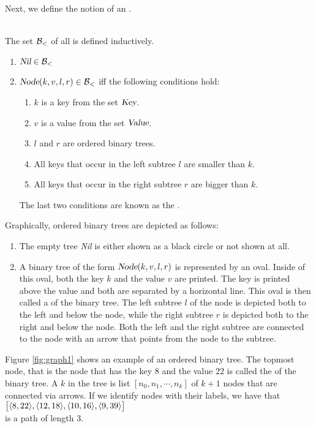 \noindent
Next, we define the notion of an  .
\begin{Definition} \hspace*{\fill} \\
  The set $\mathcal{B}_<$ of all  is defined inductively.
  \begin{enumerate}
  \item $\textsl{Nil} \in \mathcal{B}_<$
  \item $\textsl{Node}(k, v, l, r) \in \mathcal{B}_<$ \quad iff the following conditions hold:
        \begin{enumerate}
        \item $k$ is a key from the set $\textsl{Key}$.
        \item $v$ is a value from the set $\textsl{Value}$.
        \item $l$ and $r$ are ordered binary trees.
        \item All keys that occur in the left subtree $l$ are smaller than $k$.
        \item All keys that occur in the right subtree $r$ are bigger than $k$.
        \end{enumerate}
        The last two conditions are known as the .
        \eox
  \end{enumerate}
\end{Definition}
Graphically, ordered binary trees are depicted as follows:
\begin{enumerate}
\item The empty tree \textsl{Nil} is either shown as a black circle or not shown at all.
\item A binary tree of the form $\textsl{Node}(k,v,l,r)$ is represented by an oval.  Inside of this
      oval, both the key $k$ and the value $v$ are printed.  The key is printed above the value and
      both are separated by a horizontal line.  This oval is then called a
       of the binary tree. 
      The left subtree $l$ of the node is depicted both to the left and  below the node,
      while the right subtree $r$ is depicted both to the right and below the node.  Both the left
      and the right subtree are connected to the node with an arrow that points from the node to the
      subtree.
\end{enumerate}
Figure \ref{fig:graph1} shows an example of an ordered binary tree.  The topmost node, that is the
node that has the key $8$ and the value $22$ is called the  of the binary tree.
A  $k$ in the tree is  list $[n_0,n_1, \cdots, n_k]$ of
$k+1$ nodes that are connected via arrows.  If we identify nodes with their labels, we have that
\\[0.2cm]
\hspace*{1.3cm} $\bigl[ \pair(8,22), \pair(12,18), \pair(10,16), \pair(9,39) \bigr]$ \\[0.2cm]
is a path of length 3.


